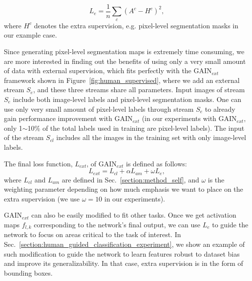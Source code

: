 \documentclass[10pt,twocolumn,letterpaper]{article}
\begin{document}
\begin{equation}
\label{eq:human_guided_loss}
{L_e} = \frac{1}{n}\sum\limits_c {{{\left( {{A^c} - {H^c}} \right)}^2}},
\end{equation}
where ${H^c}$ denotes the extra supervision, e.g. pixel-level segmentation masks in our example case.


Since generating pixel-level segmentation maps is extremely time consuming, we are more interested in finding out the benefits of using only a very small amount of data with external supervision, which fits perfectly with the GAIN$_{ext}$ framework shown in Figure~\ref{fig:human_supervised}, where we add an external stream ${S_e}$, and these three streams share all parameters. Input images of stream ${S_e}$ include both image-level labels and pixel-level segmentation masks. One can use only very small amount of pixel-level labels through stream ${S_e}$ to already gain performance improvement with GAIN$_{ext}$ (in our experiments with GAIN$_{ext}$, only 1$\sim$10\% of the total labels used in training are pixel-level labels). The input of the stream $S_{cl}$ includes all the images in the training set with only image-level labels.


The final loss function, $L_{ext}$, of GAIN$_{ext}$ is defined as follows:
\begin{equation}
\label{eq:human_guidance_loss_final}
L_{ext} = L_{cl} + \alpha L_{am} + \omega L_e,
\end{equation}
where $L_{cl}$ and $L_{am}$ are defined in Sec.~\ref{section:method_self}, and $\omega$ is the weighting parameter depending on how much emphasis we want to place on the extra supervision (we use $\omega  = 10$ in our experiments).


GAIN$_{ext}$ can also be easily modified to fit other tasks. Once we get activation maps $f_{l,k}$ corresponding to the network's final output, we can use $L_e$ to guide the network to focus on areas critical to the task of interest. In Sec.~\ref{section:human_guided_classification_experiment}, we show an example of such modification to guide the network to learn features robust to dataset bias and improve its generalizability. In that case, extra supervision is in the form of bounding boxes. %
\end{document}
